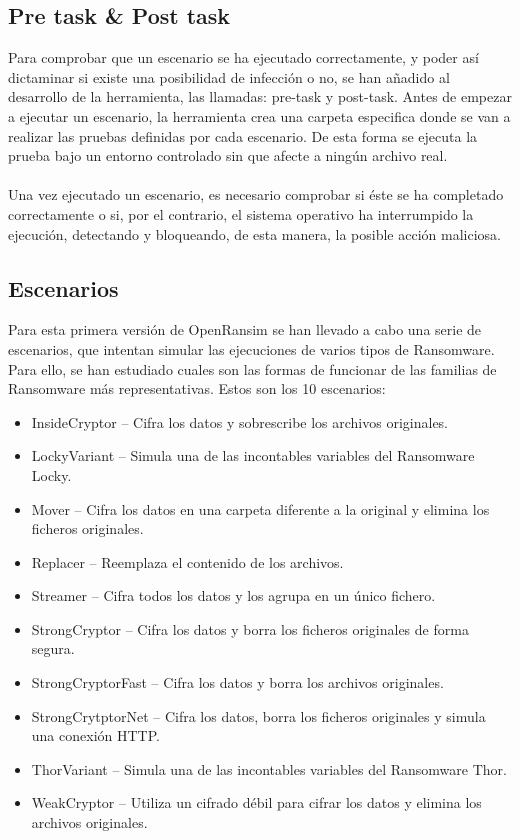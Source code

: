 \documentclass[a4paper,12pt]{article}
\begin{document}
\subsection{Pre task \& Post task}
Para comprobar que un escenario se ha ejecutado correctamente, y poder así dictaminar si existe una posibilidad de infección o no, se han añadido al desarrollo de la herramienta, las llamadas: pre-task y post-task. Antes de empezar a ejecutar un escenario, la herramienta crea una carpeta especifica donde se van a realizar las pruebas definidas por cada escenario. De esta forma se ejecuta la prueba bajo un entorno controlado sin que afecte a ningún archivo real.\\\\
Una vez ejecutado un escenario, es necesario comprobar si éste se ha completado correctamente o si, por el contrario, el sistema operativo ha interrumpido la ejecución, detectando y bloqueando, de esta manera, la posible acción maliciosa.  
\subsection{Escenarios}
Para esta primera versión de OpenRansim se han llevado a cabo una serie de escenarios, que intentan simular las ejecuciones de varios tipos de Ransomware. Para ello, se han estudiado cuales son las formas de funcionar de las familias de Ransomware más representativas. Estos son los 10 escenarios: 
\begin{itemize}
\item InsideCryptor – Cifra los datos y sobrescribe los archivos originales.
\item LockyVariant – Simula una de las incontables variables del Ransomware Locky.
\item Mover – Cifra los datos en una carpeta diferente a la original y elimina los ficheros originales.
\item Replacer – Reemplaza el contenido de los archivos.
\item Streamer – Cifra todos los datos y los agrupa en un único fichero.
\item StrongCryptor – Cifra los datos y borra los ficheros originales de forma segura.
\item StrongCryptorFast – Cifra los datos y borra los archivos originales.
\item StrongCrytptorNet – Cifra los datos, borra los ficheros originales y simula una conexión HTTP.
\item ThorVariant – Simula una de las incontables variables del Ransomware Thor.
\item WeakCryptor – Utiliza un cifrado débil para cifrar los datos y elimina los archivos originales.
\end{itemize}
\end{document}
